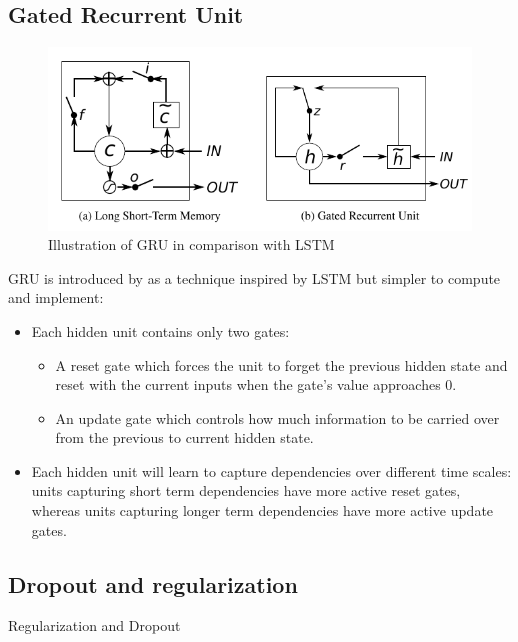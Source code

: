 \subsection*{Gated Recurrent Unit}
    \begin{figure}[H]
        \centering
        \includegraphics[width=\linewidth]{../images/chung14-fig1-lstm_gru_arch.png}
        \caption{Illustration of GRU in comparison with LSTM \cite{Chung14GRNN}} \label{fig:lstm_gru}
    \end{figure}
    GRU is introduced by \cite{cho14GRU} as a technique inspired by LSTM but simpler to compute and implement:
    \begin{itemize}
        \item Each hidden unit contains only two gates:
        \begin{itemize}
            \item A reset gate which forces the unit to forget the previous hidden state and reset with the current inputs when the gate's value approaches 0.
            \item An update gate which controls how much information to be carried over from the previous to current hidden state.
        \end{itemize}
        \item Each hidden unit will learn to capture dependencies over different time scales: units capturing short term dependencies have more active reset gates, whereas units capturing longer term dependencies have more active update gates.
    \end{itemize}

\subsection{Dropout and regularization}
    Regularization and Dropout
